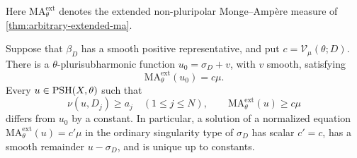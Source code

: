 Here $\mathrm{MA}^{\mathrm{ext}}_\theta$ denotes the extended non-pluripolar Monge--Amp\`ere measure of \cref{thm:arbitrary-extended-ma}.

\begin{theorem}\label{thm:divisorial-residual-equation}
Suppose that $\beta_D$ has a smooth positive representative, and put $c=\mathcal V_\mu(\theta;D)$. There is a $\theta$-plurisubharmonic function $u_0=\sigma_D+v$, with $v$ smooth, satisfying
\[
 \mathrm{MA}^{\mathrm{ext}}_\theta(u_0)=c\mu.
\]
Every $u\in\mathrm{PSH}(X,\theta)$ such that
\[
 \nu(u,D_j)\geq a_j\quad(1\leq j\leq N),\qquad
 \mathrm{MA}^{\mathrm{ext}}_\theta(u)\geq c\mu
\]
differs from $u_0$ by a constant. In particular, a solution of a normalized equation $\mathrm{MA}^{\mathrm{ext}}_\theta(u)=c'\mu$ in the ordinary singularity type of $\sigma_D$ has scalar $c'=c$, has a smooth remainder $u-\sigma_D$, and is unique up to constants.
\end{theorem}
